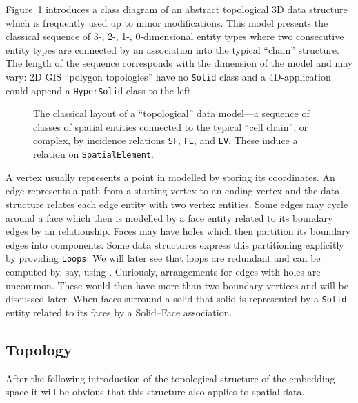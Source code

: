 \documentclass[5p]{elsarticle}
\newcommand{\qq}[1]{``#1''}
\begin{document}
Figure~\ref{fig:spatialUML} introduces a class diagram of an abstract topological 3D 
data structure which is frequently used up to minor modifications.
This model presents the classical sequence of 3-, 2-, 1-, 0-dimensional entity types 
where two consecutive entity types are connected by an association into the typical 
\qq{chain} structure. The length of the sequence corresponds with the dimension of the 
model and may vary: 2D GIS \qq{polygon topologies} have no \texttt{Solid} class and a 
4D-application could append a \texttt{HyperSolid} class to the left. 

\begin{figure}[h]

\caption{The classical layout of a \qq{topological} data model---a sequence of classes of spatial 
entities connected to the typical \qq{cell chain}, or complex, by incidence relations \texttt{SF}, 
\texttt{FE}, and \texttt{EV}. These induce a relation on \texttt{SpatialElement}.}
\label{fig:spatialUML}
\end{figure}


A vertex usually represents a point in  modelled by storing its coordinates. 
An edge represents a path from a starting vertex to an ending vertex and the data 
structure relates each edge entity with two vertex entities. 
Some edges may cycle around a face which then is modelled by a face entity 
related to its boundary edges by an  relationship. 
Faces may have holes which then partition its boundary edges into components. 
Some data structures express this partitioning explicitly by providing \texttt{Loops}. 
We will later see that loops are redundant and can be computed by, say,  
using \cite{Boltcheva:Homology}. 
Curiously, arrangements for edges with holes are uncommon. These would then have more 
than two boundary vertices and will be discussed later. 
When faces surround a solid that solid is represented by a \texttt{Solid} entity 
related to its faces by a Solid--Face association. 

\subsection{Topology}

After the following introduction of the topological structure of the embedding space 
it will be obvious that this structure also applies to spatial data. 
\end{document}
